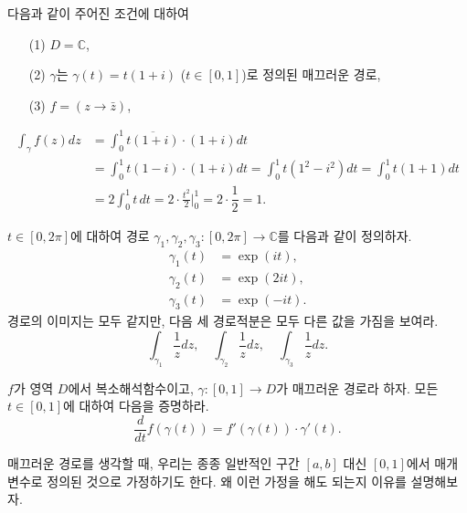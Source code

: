 \begin{saltexample}[label=example-3-2]{}{} %
다음과 같이 주어진 조건에 대하여
\begin{itemize}
\item[(1)] $D=\mathbb C$,
\item[(2)] $\gamma$는 $\gamma(t)= t(1+i)$ ($t\in[0,1]$)로 정의된 매끄러운 경로,
\item[(3)] $f = (z\to \bar z)$,
\end{itemize}
\begin{align*}
\int_\gamma f(z)dz &= \int_0^1 \overline{t(1+i)}\cdot (1+i)dt \\
&= \int_0^1 t(1-i)\cdot(1+i)dt
= \int_0^1 t(1^2-i^2)dt = \int_0^1 t(1+1)dt \\
&= 2\int_0^1 t\,dt = 2\cdot \frac{t^2}2 \Big|_0^1 = 2\cdot \dfrac12 = 1.
\end{align*}
\end{saltexample}

\begin{salt_exercise} \label{ex-3-1}
$t\in[0,2\pi]$에 대하여 
경로 $\gamma_1, \gamma_2, \gamma_3: [0,2\pi] \to \mathbb C$를
다음과 같이 정의하자.
\begin{align*}
\gamma_1(t) &= \exp(it), \\
\gamma_2(t) &= \exp(2it), \\
\gamma_3(t) &= \exp(-it).
\end{align*}
경로의 이미지는 모두 같지만, 다음 세 경로적분은 모두 다른 값을 가짐을 보여라.
\[
\int_{\gamma_1} \dfrac1zdz, \quad
\int_{\gamma_2} \dfrac1zdz, \quad
\int_{\gamma_3} \dfrac1zdz.
\]
\end{salt_exercise}

\begin{salt_exercise} \label{ex-3-2}
$f$가 영역 $D$에서 복소해석함수이고, $\gamma:[0,1]\to D$가 매끄러운 경로라 하자.
모든 $t\in[0,1]$에 대하여 다음을 증명하라.
\[
\dfrac{d}{dt} f(\gamma(t)) = f'(\gamma(t))\cdot \gamma'(t). 
\]
\end{salt_exercise}

매끄러운 경로를 생각할 때,
우리는 종종 일반적인 구간 $[a,b]$ 대신
$[0,1]$에서 매개변수로 정의된 것으로 가정하기도 한다.
왜 이런 가정을 해도 되는지 이유를 설명해보자.

